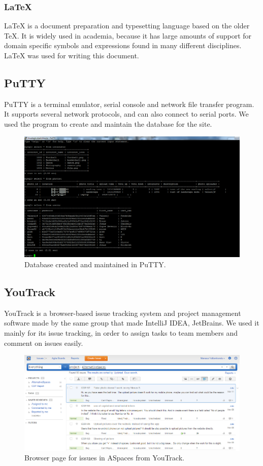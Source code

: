 \subsubsection{LaTeX} LaTeX is a document preparation and typesetting language based on the older TeX. It is widely used in academia, because it has large amounts of support for domain specific symbols and expressions found in many different disciplines. LaTeX was used for writing this document.

\subsection{PuTTY} 
\label{subsec:PlanningSoftwareDevPutty}

PuTTY is a terminal emulator, serial console and network file transfer program. It supports several network protocols, and can also connect to serial ports. We used the program to create and maintain the database for the site.

\begin{figure}
  \centering
  \includegraphics[width=\linewidth]{./Planning/img/puttydb}
  \caption{Database created and maintained in PuTTY.}
  \label{fig:PlanningSoftwareDevPutty}
\end{figure}

\subsection{YouTrack}
\label{subsec:PlanningSoftwareDevYouTrack}
YouTrack is a browser-based issue tracking system and project management software made by the same group that made IntelliJ IDEA, JetBrains. We used it mainly for its issue tracking, in order to assign tasks to team members and comment on issues easily.

\begin{figure}[ht!]
  \centering
  \includegraphics[width=\linewidth]{./Planning/img/YouTrackPage}
  \caption{Browser page for issues in ASpaces from YouTrack.}
  \label{fig:PlanningSoftwareDevYouTrack}
\end{figure}
